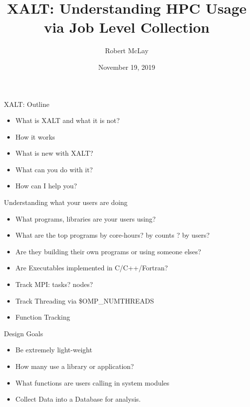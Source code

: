 \documentclass{beamer}
\begin{document}
\title[XALT]{XALT: Understanding HPC Usage via Job Level Collection}
\author{Robert McLay} 
\date{November 19, 2019} 

\frame{\titlepage} 

\begin{frame}{XALT: Outline}

  \begin{itemize}
    \item What is XALT and what it is not?
    \item How it works
    \item What is new with XALT?
    \item What can you do with it?
    \item How can I help you?
  \end{itemize}
\end{frame}

\begin{frame}{Understanding what your users are doing}
  \begin{itemize}
    \item What programs, libraries are your users using?
    \item What are the top programs by core-hours? by counts ? by users?
    \item Are they building their own programs or using someone elses?
    \item Are Executables implemented in C/C++/Fortran?
    \item Track MPI: tasks? nodes?
    \item Track Threading via \$OMP\_NUMTHREADS
    \item Function Tracking
  \end{itemize}
\end{frame}

\begin{frame}{Design Goals}
  \begin{itemize}
    \item Be extremely light-weight
    \item How many use a library or application?
    \item What functions are users calling in system modules
    \item Collect Data into a Database for analysis.
  \end{itemize}
\end{frame}
\end{document}

